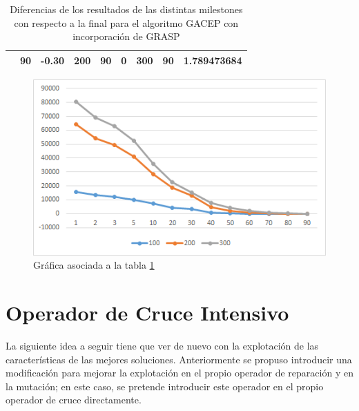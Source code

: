 \begin{table}[h]
\begin{tabular}{|cclcclccl|}
\rowcolor[HTML]{DAE8FC} 
\multicolumn{1}{|c|}{\multirow{-13}{*}{\cellcolor[HTML]{FFFFC7}\textbf{100}}} & \multicolumn{1}{c|}{\cellcolor[HTML]{DAE8FC}90}        & \multicolumn{1}{l|}{\cellcolor[HTML]{DAE8FC}-0.30}      & \multicolumn{1}{c|}{\multirow{-13}{*}{\cellcolor[HTML]{FFFFC7}\textbf{200}}} & \multicolumn{1}{c|}{\cellcolor[HTML]{DAE8FC}90}        & \multicolumn{1}{l|}{\cellcolor[HTML]{DAE8FC}0}           & \multicolumn{1}{c|}{\multirow{-13}{*}{\cellcolor[HTML]{FFFFC7}\textbf{300}}} & \multicolumn{1}{c|}{\cellcolor[HTML]{DAE8FC}90}        & 1.789473684 \\ \hline
\end{tabular}
\caption{\label{DiferenciasGACEP_GRASP}Diferencias de los resultados de las distintas milestones con respecto a la final para el algoritmo GACEP con incorporación de GRASP}
\end{table}


\begin{figure}[h]
		\centering
		\includegraphics[scale=1]{imagenes/Experimental/DiferenciasGACEP_GRASP.png}
        \caption{Gráfica asociada a la tabla \ref{DiferenciasGACEP_GRASP}}
        \label{fig:DiferenciasGACEP}
\end{figure}

\section{Operador de Cruce Intensivo}

La siguiente idea a seguir tiene que ver de nuevo con la explotación de las características de las mejores soluciones. 
Anteriormente se propuso introducir una modificación para mejorar la explotación en el propio operador de reparación y en la mutación; en este caso, se pretende introducir este operador en el propio operador de cruce directamente. 

